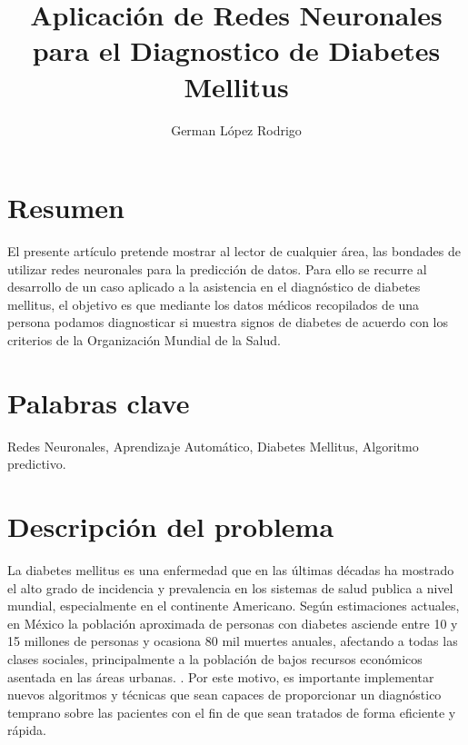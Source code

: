 \documentclass[letterpaper, 10 pt, conference]{ieeeconf}
\title{\LARGE \bf Aplicación de Redes Neuronales para el Diagnostico de Diabetes Mellitus}
\author{German López Rodrigo\\}
\begin{document}
\maketitle
\thispagestyle{empty}
\pagestyle{empty}

\section{Resumen}
El presente artículo pretende mostrar al lector de cualquier área, las bondades de utilizar redes neuronales para la predicción de datos. Para ello se recurre al desarrollo de un caso aplicado a la asistencia en el diagnóstico de diabetes mellitus, el objetivo es que mediante los datos médicos recopilados de una persona podamos diagnosticar si muestra signos de diabetes de acuerdo con los criterios de la Organización Mundial de la Salud.

\section{Palabras clave}
Redes Neuronales, Aprendizaje Automático, Diabetes Mellitus, Algoritmo predictivo.

\section{Descripción del problema}

La diabetes mellitus es una enfermedad que en las últimas décadas ha mostrado el alto grado de incidencia y prevalencia en los sistemas de salud publica a nivel mundial, especialmente en el continente Americano. Según estimaciones actuales, en México la población aproximada de personas con diabetes asciende entre 10 y 15 millones de personas y ocasiona 80 mil muertes anuales, afectando a todas las clases sociales, principalmente a la población de bajos recursos económicos asentada en las áreas urbanas. \cite{1}. Por este motivo, es importante implementar nuevos algoritmos y técnicas que sean capaces de proporcionar un diagnóstico temprano sobre las pacientes con el fin de que sean tratados de forma eficiente y rápida.\\
\end{document}
